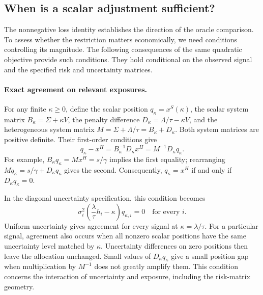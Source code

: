 \subsection{When is a scalar adjustment sufficient?}
\label{app:scalar-sufficiency}
The nonnegative loss identity establishes the direction of the oracle comparison. To assess whether the restriction matters economically, we need conditions controlling its magnitude. The following consequences of the same quadratic objective provide such conditions. They hold conditional on the observed signal and the specified risk and uncertainty matrices.

\paragraph{Exact agreement on relevant exposures.}
For any finite $\kappa\geq0$, define the scalar position $q_\kappa=x^S(\kappa)$, the scalar system matrix $B_\kappa=\Sigma+\kappa V$, the penalty difference $D_\kappa=\Lambda/\tau-\kappa V$, and the heterogeneous system matrix $M=\Sigma+\Lambda/\tau=B_\kappa+D_\kappa$. Both system matrices are positive definite. Their first-order conditions give
\begin{equation}
q_\kappa-x^H=B_\kappa^{-1}D_\kappa x^H
             =M^{-1}D_\kappa q_\kappa.
\label{eq:position-gap}
\end{equation}
For example, $B_\kappa q_\kappa=Mx^H=s/\gamma$ implies the first equality; rearranging $Mq_\kappa=s/\gamma+D_\kappa q_\kappa$ gives the second. Consequently, $q_\kappa=x^H$ if and only if $D_\kappa q_\kappa=0$.

In the diagonal uncertainty specification, this condition becomes
\begin{equation}
\sigma_i^2\left(\frac{\lambda}{\tau}h_i-\kappa\right)q_{\kappa,i}=0
\quad\text{for every }i.
\label{eq:exact-scalar}
\end{equation}
Uniform uncertainty gives agreement for every signal at $\kappa=\lambda/\tau$. For a particular signal, agreement also occurs when all nonzero scalar positions have the same uncertainty level matched by $\kappa$. Uncertainty differences on zero positions then leave the allocation unchanged. Small values of $D_\kappa q_\kappa$ give a small position gap when multiplication by $M^{-1}$ does not greatly amplify them. This condition concerns the interaction of uncertainty and exposure, including the risk-matrix geometry.

